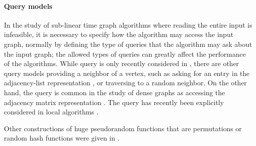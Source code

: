 \paragraph*{Query models}
In the study of sub-linear time graph algorithms where reading the entire input is infeasible,
it is necessary to specify how the algorithm may access the input graph,
normally by defining the type of queries that the algorithm may ask about the input graph;
the allowed types of queries 
can greatly affect the performance of the algorithms.
While  query is only recently considered in \cite{reut},
there are other query models providing a neighbor of a vertex,
such as asking for an entry in the adjacency-list representation \cite{goldreich1997property},
or traversing to a random neighbor. On the other hand,
the
 query is common in the study of dense graphs as accessing the adjacency matrix representation \cite{goldreich1998property}.
The  query has recently been explicitly considered in local algorithms \cite{feige2017probe}.

Other constructions of huge pseudorandom functions that are permutations or random hash functions were given in \cite{luby_rackoff, naor, mansour}.
